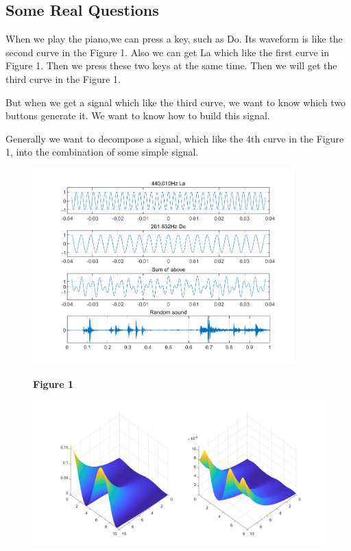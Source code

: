 \documentclass[margin,line]{res}
\begin{document}
\begin{resume}
\subsection{\textbf{Some Real Questions}}
When we play the piano,we can press a key, such as Do. Its waveform is like the second curve in the Figure 1. Also we can get La which like the first curve in Figure 1. Then we press these two keys at the same time. Then we will get the third curve in the Figure 1.\par
But when we get a signal which like the third curve, we want to know which two buttons generate it. We want to know how to build this signal.\par
Generally we want to decompose a signal, which like the 4th curve in the Figure 1, into the combination of some simple signal.\par
\begin{figure}[H]
  \begin{minipage}{0.42\linewidth}
    \centerline{\includegraphics[width=0.9\textwidth]{figure/fig_1.png}}
    \centerline{\textbf{Figure 1}}
  \end{minipage}
  \begin{minipage}{0.55\linewidth}
    \centerline{\includegraphics[width=\textwidth]{figure/fig_2.png}}

\end{minipage}
\end{figure}
\end{resume}
\end{document}
